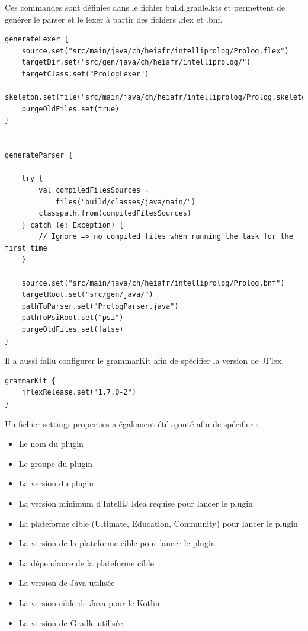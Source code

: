 \noindent Ces commandes sont définies dans le fichier build.gradle.kts et permettent de générer le parser et le lexer à partir des fichiers .flex et .bnf.
\begin{lstlisting}
generateLexer {
    source.set("src/main/java/ch/heiafr/intelliprolog/Prolog.flex")
    targetDir.set("src/gen/java/ch/heiafr/intelliprolog/")
    targetClass.set("PrologLexer")
    skeleton.set(file("src/main/java/ch/heiafr/intelliprolog/Prolog.skeleton"))
    purgeOldFiles.set(true)
}


generateParser {

    try {
        val compiledFilesSources =
            files("build/classes/java/main/")
        classpath.from(compiledFilesSources)
    } catch (e: Exception) {
        // Ignore => no compiled files when running the task for the first time
    }

    source.set("src/main/java/ch/heiafr/intelliprolog/Prolog.bnf")
    targetRoot.set("src/gen/java/")
    pathToParser.set("PrologParser.java")
    pathToPsiRoot.set("psi")
    purgeOldFiles.set(false)
}
\end{lstlisting}
\noindent Il a aussi fallu configurer le grammarKit afin de spécifier la version de JFlex.

\begin{lstlisting}
grammarKit {
    jflexRelease.set("1.7.0-2")
}
\end{lstlisting}

Un fichier settings.properties a également été ajouté afin de spécifier :
\begin{itemize}
    \item Le nom du plugin
    \item Le groupe du plugin
    \item La version du plugin
    \item La version minimum d'IntelliJ Idea requise pour lancer le plugin
    \item La plateforme cible (Ultimate, Education, Community) pour lancer le plugin
    \item La version de la plateforme cible pour lancer le plugin
    \item La dépendance de la plateforme cible
    \item La version de Java utilisée
    \item La version cible de Java pour le Kotlin
    \item La version de Gradle utilisée
\end{itemize}

